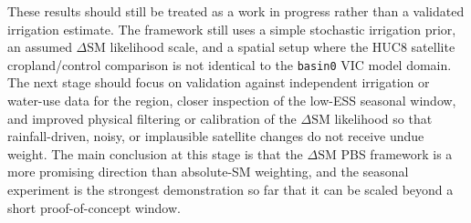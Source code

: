 \documentclass[11pt]{article}
\newcommand{\code}[1]{\texttt{#1}}
\begin{document}
These results should still be treated as a work in progress rather than a validated irrigation estimate. The framework still uses a simple stochastic irrigation prior, an assumed $\Delta \mathrm{SM}$ likelihood scale, and a spatial setup where the HUC8 satellite cropland/control comparison is not identical to the \code{basin0} VIC model domain. The next stage should focus on validation against independent irrigation or water-use data for the region, closer inspection of the low-ESS seasonal window, and improved physical filtering or calibration of the $\Delta \mathrm{SM}$ likelihood so that rainfall-driven, noisy, or implausible satellite changes do not receive undue weight. The main conclusion at this stage is that the $\Delta \mathrm{SM}$ PBS framework is a more promising direction than absolute-SM weighting, and the seasonal experiment is the strongest demonstration so far that it can be scaled beyond a short proof-of-concept window.
\end{document}
